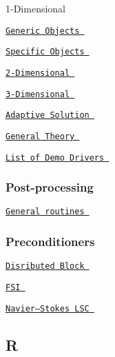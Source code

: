  
\begin{DoxyItemize}
\item  1-\/\-Dimensional   
\begin{DoxyItemize}
\item  \href{ ../../quick_guide/html/index.html }{\tt Generic Objects }  
\item  \href{ ../../poisson/one_d_poisson/html/index.html }{\tt Specific Objects }  
\end{DoxyItemize} 
\item  \href{ ../../poisson/two_d_poisson/html/index.html }{\tt 2-\/\-Dimensional }  
\item  \href{ ../../poisson/eighth_sphere_poisson/html/index.html }{\tt 3-\/\-Dimensional }  
\item  \href{ ../../poisson/fish_poisson/html/index.html }{\tt Adaptive Solution }  
\item  \href{ ../../intro/html/index.html }{\tt General Theory }  
\item  \href{ ../../example_code_list/html/index.html#poisson }{\tt List of Demo Drivers }  
\end{DoxyItemize} \subsubsection*{ Post-\/processing }

 
\begin{DoxyItemize}
\item  \href{ ../../poisson/one_d_poisson/html/index.html#doc }{\tt General routines }  
\end{DoxyItemize} \subsubsection*{ Preconditioners }

 
\begin{DoxyItemize}
\item  \href{ ../../mpi/distributed_block_preconditioners/html/index.html }{\tt Disributed Block }  
\item  \href{ ../../preconditioners/fsi/html/index.html }{\tt F\-S\-I }  
\item  \href{ ../../preconditioners/lsc_navier_stokes/html/index.html }{\tt Navier--Stokes L\-S\-C }  
\end{DoxyItemize}  \subsection*{ R }

